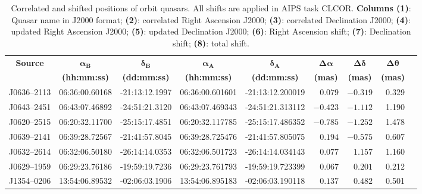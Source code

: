 		\begin{table}[h]
			\scriptsize
			\centering
			\caption[Quasar shifts]{Correlated and shifted positions of orbit quasars. All shifts are applied in AIPS task CLCOR. \textbf{Columns (1)}: Quasar name in J2000 format; \textbf{(2)}: correlated Right Ascension J2000; \textbf{(3)}: correlated Declination J2000; \textbf{(4)}: updated Right Ascension J2000; \textbf{(5)}: updated Declination J2000; \textbf{(6)}: Right Ascension shift; \textbf{(7)}: Declination shift; \textbf{(8)}: total shift.}
			{\onehalfspacing
				\begin{tabular}{lccccrrrr} \hline
					\multicolumn{1}{c}{\bf Source} &
					\multicolumn{1}{c}{$\boldsymbol{\alpha_B}$} & 
					\multicolumn{1}{c}{$\boldsymbol{\delta_B}$} & 
					\multicolumn{1}{c}{$\boldsymbol{\alpha_A}$} & 
					\multicolumn{1}{c}{$\boldsymbol{\delta_A}$} & 
					\multicolumn{1}{c}{$\boldsymbol{\Delta\alpha}$} & 
					\multicolumn{1}{c}{$\boldsymbol{\Delta\delta}$} & 	
					\multicolumn{1}{c}{$\boldsymbol{\Delta\theta}$} \\ 	
					\multicolumn{1}{c}{} & 
					\multicolumn{1}{c}{\textbf{(hh:mm:ss)}} & 
					\multicolumn{1}{c}{\textbf{(dd:mm:ss)}} & 
					\multicolumn{1}{c}{\textbf{(hh:mm:ss)}} & 
					\multicolumn{1}{c}{\textbf{(dd:mm:ss)}} & 
					\multicolumn{1}{c}{\textbf{(mas)}} & 
					\multicolumn{1}{c}{\textbf{(mas)}} &
					\multicolumn{1}{c}{\textbf{(mas)}} \\
					\hline
					J0636--2113 &  06:36:00.60168 & -21:13:12.1997 & 06:36:00.601601 & -21:13:12.200019 & $ 0.079$ & $-0.319$ & 0.329 \\
					J0643--2451 &  06:43:07.46892 & -24:51:21.3120 & 06:43:07.469343 & -24:51:21.313112 & $-0.423$ & $-1.112$ & 1.190 \\
					J0620--2515 &  06:20:32.11700 & -25:15:17.4851 & 06:20:32.117785 & -25:15:17.486352 & $-0.785$ & $-1.252$ & 1.478 \\
					J0639--2141 &  06:39:28.72567 & -21:41:57.8045 & 06:39:28.725476 & -21:41:57.805075 & $ 0.194$ & $-0.575$ & 0.607 \\
					J0632--2614 &  06:32:06.50180 & -26:14:14.0353 & 06:32:06.501723 & -26:14:14.034143 & $ 0.077$ & $ 1.157$ & 1.160 \\
					J0629--1959 &  06:29:23.76186 & -19:59:19.7236 & 06:29:23.761793 & -19:59:19.723399 & $ 0.067$ & $ 0.201$ & 0.212 \\\hline
					J1354--0206 &  13:54:06.89532 & -02:06:03.1906 & 13:54:06.895183 & -02:06:03.190118 & $ 0.137$ & $ 0.482$ & 0.501 \\

\end{tabular}}
\end{table}
